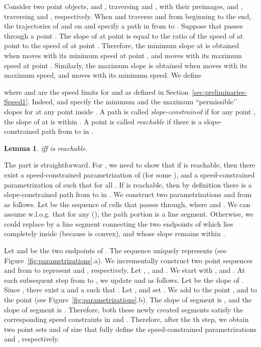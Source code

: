 \documentclass[12pt]{dalthesis}
\def\favoritefont{\bfseries \sffamily}
\def\QED{\ensuremath{{\Box}}}
\def\markatright#1{\leavevmode\unskip\nobreak\quad\hspace*{\fill}{#1}}
\newenvironment{proof}
	{\begin{trivlist}\item[\hskip\labelsep{\favoritefont Proof:}]}
	{\markatright{\QED}\end{trivlist}}
\newtheorem{lemma}[theorem]{Lemma}
\begin{document}
Consider two point objects,  and , traversing  and , with their preimages,  and , traversing  and , respectively.
When  and  traverse  and  from beginning to the end,
the trajectories of  and  on  and 
specify a path  in  from  to .
Suppose that  passes through a point .
The slope of  at point  is
equal to the ratio of the speed of  at point 
to the speed of  at point .
Therefore, the minimum slope at  is obtained 
when  moves with its minimum speed at point , 
and  moves with its maximum speed at point .
Similarly, the maximum slope is obtained 
when  moves with its maximum speed, 
and  moves with its minimum speed.
We define 

where  and  are the speed limits for  and  as
defined in Section~\ref{sec:preliminaries-Speed1}.
Indeed,  and  specify
the minimum and the maximum ``permissible\rq{}\rq{} slopes 
for  at any point inside .
A path  is called {\em slope-constrained\/}
if for any point ,
the slope of  at  is within .
A point  is called {\em reachable\/} 
if there is a slope-constrained path from  to  in .


\begin{lemma} \label{lemma:reachable}
	 iff  is reachable. 
\end{lemma}

\begin{proof}
	The  part is straightforward. 
	For ,
	we need to show that if  is reachable, then  there exist a speed-constrained parametrization
	 of  (for some ), 
	and  a speed-constrained parametrization 
	 of  such that
	 for all .
	If  is reachable, then by definition there is a
	slope-constrained path  from  to  in .
	We construct two parametrizations  and  from  as follows.
	Let  be the sequence of cells 
	that  passes through, where  and .
	We can assume w.l.o.g. that for any  (),
	the path portion 
	is a line segment. Otherwise, we could replace 
	 by a line segment connecting the two endpoints of 
	which lies completely inside  (because  is convex),
	and whose slope remains within .

	Let  and  be the two endpoints of .
	The sequence  uniquely represents 
	(see Figure~\ref{fig:parametrizations}.a).
	We incrementally construct two point sequences  and  from  to represent
	 and , respectively.
	Let , , and .
	We start with , and .
	At each subsequent step  from  to , we update  and  as follows.
	Let  be the slope of .
	Since ,
	there exist a 
	and a  
	such that .
	Let , and set .
	We add to  the point , and to  the point 
	(see Figure~\ref{fig:parametrizations}.b).
	The slope of  segment  is , and 
	the slope of segment  is .
	Therefore, both these newly created segments 
	satisfy the corresponding speed constraints in  and .
	Therefore, after the th step, we obtain two point sets  and  of size 
	that fully define the speed-constrained parametrizations  and , respectively.
\end{proof}
\end{document}
